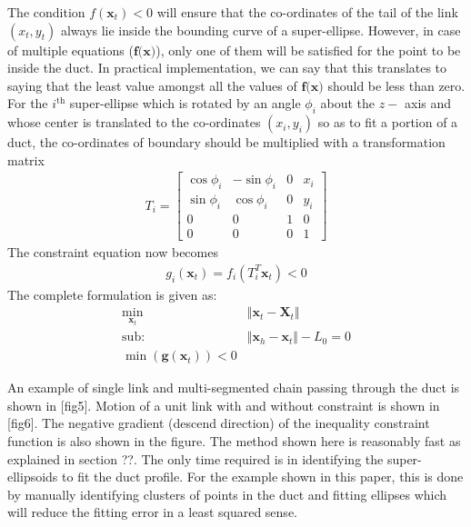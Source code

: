 \documentclass[12pt,a4]{article}
\begin{document}
The condition $f(\textbf{x}_t)<0$ will ensure that the co-ordinates of the tail of the link $(x_t,y_t)$ always lie inside the bounding curve of a super-ellipse. However, in case of multiple equations ($\textbf{f(x)}$), only one of them will be satisfied for the point to be inside the duct. In practical implementation, we can say that this translates to saying that the least value amongst all the values of $\textbf{f(x)}$ should be less than zero. For the $i^\text{th}$ super-ellipse which is rotated by an angle $\phi_i$ about the $z-$ axis and whose center is translated to the co-ordinates $(x_i,y_i)$ so as to fit a portion of a duct, the co-ordinates of boundary should be multiplied with a transformation matrix
\begin{align}
T_i = \begin{bmatrix}
\cos \phi_i & -\sin\phi_i & 0 & x_i\\
\sin \phi_i & \cos\phi_i & 0 & y_i\\
0 & 0 & 1 &0\\
0 & 0 & 0 & 1
\end{bmatrix}
\end{align}
The constraint equation now becomes 
\begin{align}
g_i(\textbf{x}_t) = f_i(T_i^T\textbf{x}_t)< 0
\end{align}
The complete formulation is given as:
\begin{align}
\label{eq: min,mingx}
\min_{\textbf{x}_t} &\Vert \textbf{x}_t-\textbf{X}_t \Vert\\
\text{sub:~~~} &\Vert \textbf{x}_h - \textbf{x}_t \Vert -L_0 = 0\\
\min\left(\textbf{g}(\textbf{x}_t)\right) < 0
\end{align}

An example of single link and multi-segmented chain passing through the duct is shown in [fig5]. Motion of a unit link with and without constraint is shown in [fig6]. The negative gradient (descend direction) of the inequality constraint function is also shown in the figure. The method shown here is reasonably fast as explained in section ??. The only time required is in identifying the super-ellipsoids to fit the duct profile. For the example shown in this paper, this is done by manually identifying clusters of points in the duct and fitting ellipses which will reduce the fitting error in a least squared sense.
\end{document}
